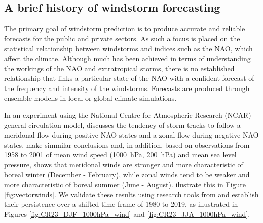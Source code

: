     \subsection{A brief history of windstorm forecasting}
        The primary goal of windstorm prediction is to produce accurate and reliable forecasts for the public and private sectors. As such a focus is placed on the statistical relationship between windstorms and indices such as the NAO, which affect the climate. Although much has been achieved in terms of understanding the workings of the NAO and extratropical storms, there is no established relationship that links a particular state of the NAO with a confident forecast of the frequency and intensity of the windstorms. Forecasts are produced through ensemble modells in local or global climate simulations. 
        
        In an experiment using the National Centre for Atmospheric Research (NCAR) general circulation model, \cite{TheEffectsofNorthAtlanticSSTandSeaIceAnomaliesontheWinterCirculationinCCM3PartIMainFeaturesandStormTrackCharacteristicsoftheResponse} discusses the tendency of storm tracks to follow a meridonal flow during positive NAO states and a zonal flow during negative NAO states. \cite{Hurrell2003} make simmilar conclusions and, in addition, based on observations from 1958 to 2001 of mean wind speed (1000~hPa, 200~hPa) and mean sea level pressure, shows that meridonal winds are stronger and more characteristic of boreal winter (December - February), while zonal winds tend to be weaker and more characteristic of boreal summer (June - August). \citeauthor{Hurrell2003} ilustrate this in Figure \ref{fig:vectorwinds}. We validate these results using research tools from \cite{ClimateReanalyzer2023} and establish their persistence over a shifted time frame of 1980 to 2019, as illustrated in Figures \ref{fig:CR23_DJF_1000hPa_wind} and \ref{fig:CR23_JJA_1000hPa_wind}.
    

